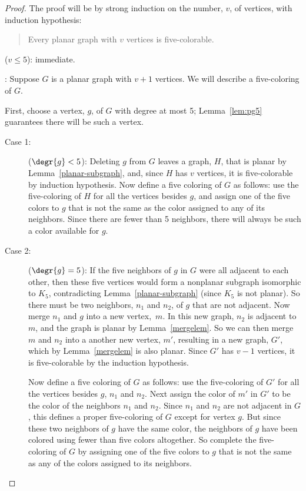 \begin{proof}
The proof will be by strong induction on the number, $v$, of vertices, with
induction hypothesis:
\begin{quote}
Every planar graph with $v$ vertices is five-colorable.
\end{quote}

 ($v \leq 5$): immediate.

: Suppose $G$ is a planar graph with
$v+1$ vertices.  We will describe a five-coloring of $G$.

First, choose a vertex, $g$, of $G$ with degree at most 5;
Lemma~\ref{lem:pg5} guarantees there will be such a vertex.
\begin{description}

\item[Case 1:] ($\degr{g}<5$): Deleting $g$ from $G$ leaves a graph,
$H$, that is planar by Lemma~\ref{planar-subgraph}, and, since $H$
has $v$ vertices, it is five-colorable by induction hypothesis.  Now
define a five coloring of $G$ as follows: use the five-coloring of $H$
for all the vertices besides $g$, and assign one of the five colors to
$g$ that is not the same as the color assigned to any of its
neighbors.  Since there are fewer than 5 neighbors, there will always
be such a color available for $g$.

\item[Case 2:] ($\degr{g}=5$): If the five neighbors of $g$ in $G$
  were all adjacent to each other, then these five vertices would form
  a nonplanar subgraph isomorphic to $K_5$, contradicting
  Lemma~\ref{planar-subgraph} (since $K_5$ is not planar).  So there
  must be two neighbors, $n_1$ and $n_2$, of $g$ that are not
  adjacent.  Now merge $n_1$ and $g$ into a new vertex,~$m$.  In this
  new graph, $n_2$ is adjacent to $m$, and the graph is planar by
  Lemma~\ref{mergelem}.  So we can then merge $m$ and $n_2$ into a
  another new vertex, $m'$, resulting in a new graph, $G'$, which by
  Lemma~\ref{mergelem} is also planar.  Since $G'$ has $v-1$
  vertices, it is five-colorable by the induction hypothesis.

  Now define a five coloring of $G$ as follows: use the five-coloring of $G'$
  for all the vertices besides $g$, $n_1$ and $n_2$.  Next assign the
  color of $m'$ in $G'$ to be the color of the neighbors $n_1$ and $n_2$.
  Since $n_1$ and $n_2$ are not adjacent in $G$, this defines a proper
  five-coloring of $G$ except for vertex $g$.  But since these two
  neighbors of $g$ have the same color, the neighbors of $g$ have been
  colored using fewer than five colors altogether.  So complete the
  five-coloring of $G$ by assigning one of the five colors to $g$ that is
  not the same as any of the colors assigned to its neighbors.
\end{description}

\end{proof}

